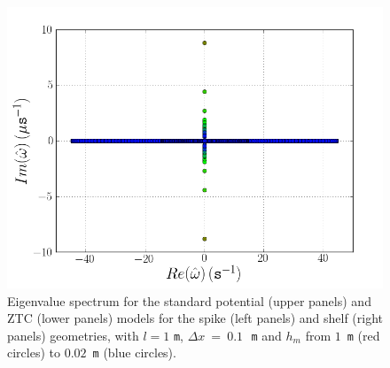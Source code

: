 \begin{figure}
  \includegraphics[width=\twofigs]{chapters/lopes/png/L1_dx_0_1_hm_shelf_spectrum_Zhao.png}
  \caption{Eigenvalue spectrum for the standard potential (upper
    panels) and ZTC (lower panels) models for the spike (left panels) and
    shelf (right panels) geometries, with $l=1$ {\tt m}, $\Delta
    x~=~0.1$\,~{\tt m} and $h_m$ from $1$~{\tt m} (red circles) to
    $0.02$~{\tt m} (blue circles).}
  \label{fig:lopes:spectrumhm2}
\end{figure}

